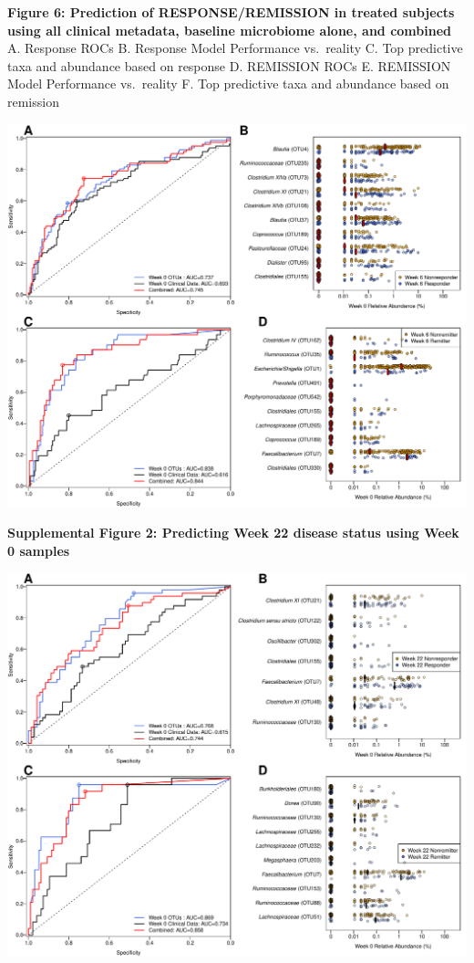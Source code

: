 \documentclass[11pt,]{article}
\begin{document}
\newpage

\textbf{Figure 6: Prediction of RESPONSE/REMISSION in treated subjects
using all clinical metadata, baseline microbiome alone, and combined} A.
Response ROCs B. Response Model Performance vs.~reality C. Top
predictive taxa and abundance based on response D. REMISSION ROCs E.
REMISSION Model Performance vs.~reality F. Top predictive taxa and
abundance based on remission

\includegraphics{figures/Figure6_wk0Xwk6pred.pdf}

\newpage

\textbf{Supplemental Figure 2: Predicting Week 22 disease status using
Week 0 samples}

\includegraphics{figures/SF2-wk22predfig.pdf}
\end{document}
